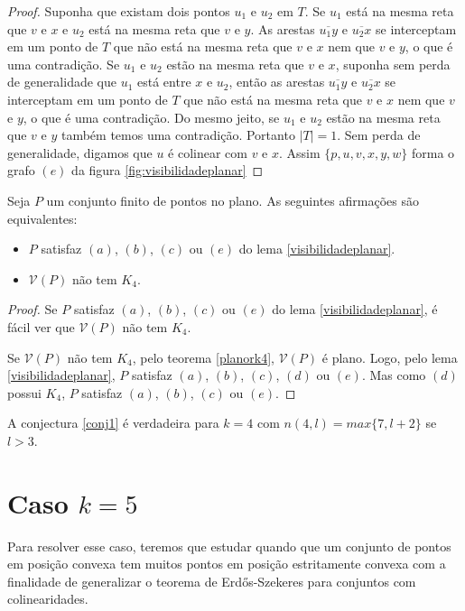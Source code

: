 \begin{proof}
    Suponha que existam dois pontos $u_1$ e $u_2$ em $T$. Se $u_1$ está na mesma reta que $v$ e $x$ e $u_2$ está na mesma reta que $v$ e $y$. As arestas $\overline{u_1y}$ e $\overline{u_2x}$ se interceptam em um ponto de $T$ que não está na mesma reta que $v$ e $x$ nem que $v$ e $y$, o que é uma contradição. Se $u_1$ e $u_2$ estão na mesma reta que $v$ e $x$, suponha sem perda de generalidade que $u_1$ está entre $x$ e $u_2$, então as arestas $\overline{u_1y}$ e $\overline{u_2x}$ se interceptam em um ponto de $T$ que não está na mesma reta que $v$ e $x$ nem que $v$ e $y$, o que é uma contradição. Do mesmo jeito, se $u_1$ e $u_2$ estão na mesma reta que $v$ e $y$ também temos uma contradição. Portanto $|T|=1$. Sem perda de generalidade, digamos que $u$ é colinear com $v$ e $x$. Assim $\{p,u,v,x,y,w\}$ forma o grafo $(e)$ da figura \ref{fig:visibilidadeplanar}
\end{proof}
\begin{teorema}
    Seja $P$ um conjunto finito de pontos no plano. As seguintes afirmações são equivalentes:
    \begin{itemize}
        \item
            $P$ satisfaz $(a)$, $(b)$, $(c)$ ou $(e)$ do lema \ref{visibilidadeplanar}.
        \item
            $\mathcal V(P)$ não tem $K_4$.
    \end{itemize}
\end{teorema}
\begin{proof}
    Se $P$ satisfaz $(a)$, $(b)$, $(c)$ ou $(e)$ do lema \ref{visibilidadeplanar}, é fácil ver que $\mathcal V(P)$ não tem $K_4$.

    Se $\mathcal V(P)$ não tem $K_4$, pelo teorema \ref{planork4}, $\mathcal V(P)$ é plano. Logo, pelo lema \ref{visibilidadeplanar}, $P$ satisfaz $(a)$, $(b)$, $(c)$, $(d)$ ou $(e)$. Mas como $(d)$ possui $K_4$, $P$ satisfaz $(a)$, $(b)$, $(c)$ ou $(e)$.
\end{proof}

\begin{corolario}
    A conjectura \ref{conj1} é verdadeira para $k=4$ com $n(4,l)=max\{7,l+2\}$ se $l>3$.
\end{corolario}

\section{Caso $k=5$}
Para resolver esse caso, teremos que estudar quando que um conjunto de pontos em posição convexa tem muitos pontos em posição estritamente convexa com a finalidade de generalizar o teorema de Erd\H os-Szekeres para conjuntos com colinearidades.

